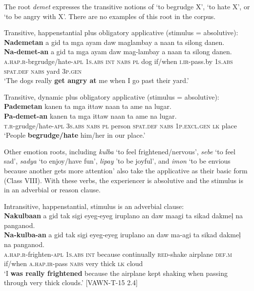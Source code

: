 The root \textit{demet} expresses the transitive notions of ‘to begrudge X’, ‘to hate X’, or ‘to be angry with X’. There are no examples of this root in the corpus.

\ea 
Transitive, happenstantial plus obligatory applicative (stimulus = absolutive): \\
\textbf{Nademetan}  a  gid  ta  mga  ayam  daw  maglambay a  naan  ta  silong  danen. \\\smallskip
\gll \textbf{Na-demet-an}  a  gid  ta  mga  ayam  daw  mag-lambay a  naan  ta  silong  danen. \\
\textsc{a.hap.r}-brgrudge/hate-\textsc{apl}  1\textsc{s.abs}  \textsc{int}  \textsc{nabs}  \textsc{pl}  dog  if/when  \textsc{i.ir}-pass.by
1\textsc{s.abs}  \textsc{spat.def}  \textsc{nabs}  yard  3\textsc{p.gen} \\
\glt `The dogs really \textbf{get angry at} me when I go past their yard.’ 
\z  

\newpage
\ea 
Transitive, dynamic plus obligatory applicative (stimulus = absolutive): \\
\textbf{Pademetan}  kanen  ta  mga  ittaw  naan  ta  ame na  lugar.\\\smallskip
\gll \textbf{Pa-demet-an}  kanen  ta  mga  ittaw  naan  ta  ame na  lugar.\\
\textsc{t.r}-grudge/hate-\textsc{apl}  3\textsc{s.abs}  \textsc{nabs}  \textsc{pl}  person  \textsc{spat.def}  \textsc{nabs}  1\textsc{p.excl.gen} \textsc{lk}  place \\
\glt ‘People \textbf{begrudge/hate} him/her in our place.’
\z

Other emotion roots, including \textit{kulba} ‘to feel frightened/nervous’, \textit{sebe} ‘to feel sad’, \textit{sadya} ‘to enjoy/have fun’, \textit{lipay} ’to be joyful’, and \textit{imon} ‘to be envious because another gets more attention’ also take the applicative as their basic form (Class VIII). With these verbs, the experiencer is absolutive and the stimulus is in an adverbial or reason clause.

\ea
Intransitive, happenstantial, stimulus is an adverbial clause: \\
\textbf{Nakulbaan}  a  gid  tak  sigi  eyeg-eyeg iruplano  an  daw  maagi  ta  sikad  dakmeļ  na  panganod. \\\smallskip
\gll \textbf{Na-kulba-an}  a  gid  tak  sigi  eyeg-eyeg iruplano  an  daw  ma-agi  ta  sikad  dakmeļ  na  panganod. \\
\textsc{a.hap.r}-frighten-\textsc{apl}  1\textsc{s.abs}  \textsc{int}  because  continually  \textsc{red}-shake
airplane  \textsc{def.m}  if/when  \textsc{a.hap.ir}-pass  \textsc{nabs}  very  thick  \textsc{lk}  cloud \\
\glt `I \textbf{was really frightened} because the airplane kept shaking when passing through very thick clouds.’ [VAWN-T-15 2.4]
\z

